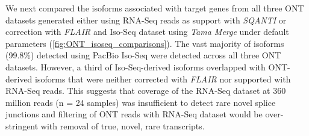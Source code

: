 We next compared the isoforms associated with target genes from all three ONT datasets generated either using RNA-Seq reads as support with \textit{SQANTI} or correction with \textit{FLAIR} and Iso-Seq dataset using \textit{Tama Merge} under default parameters (\cref{fig:ONT_isoseq_comparisons}). The vast majority of isoforms (99.8\%) detected using PacBio Iso-Seq were detected across all three ONT datasets. However, a third of Iso-Seq-derived isoforms overlapped with ONT-derived isoforms that were neither corrected with \textit{FLAIR} nor supported with RNA-Seq reads. This suggests that coverage of the RNA-Seq dataset at 360 million reads (n = 24 samples) was insufficient to detect rare novel splice junctions and filtering of ONT reads with RNA-Seq dataset would be over-stringent with removal of true, novel, rare transcripts. %

